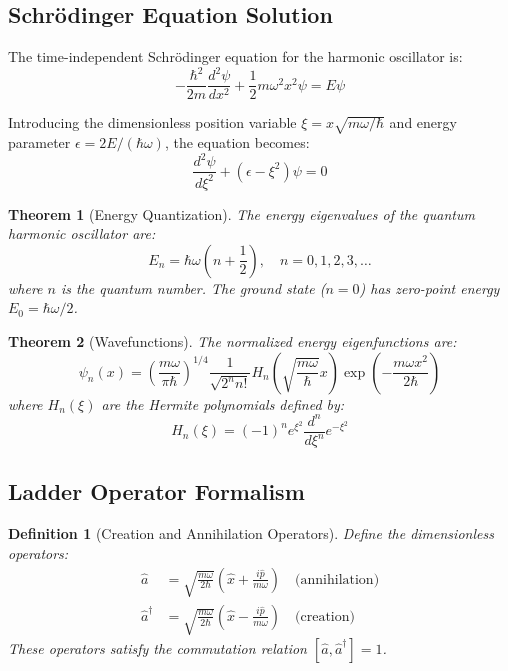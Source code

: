 \documentclass[a4paper, 11pt]{article}
\newtheorem{definition}{Definition}[section]
\newtheorem{theorem}{Theorem}[section]
\begin{document}
\subsection{Schrödinger Equation Solution}

The time-independent Schrödinger equation for the harmonic oscillator is:
\begin{equation}
-\frac{\hbar^2}{2m}\frac{d^2\psi}{dx^2} + \frac{1}{2}m\omega^2 x^2 \psi = E\psi
\end{equation}

Introducing the dimensionless position variable $\xi = x\sqrt{m\omega/\hbar}$ and energy
parameter $\epsilon = 2E/(\hbar\omega)$, the equation becomes:
\begin{equation}
\frac{d^2\psi}{d\xi^2} + (\epsilon - \xi^2)\psi = 0
\end{equation}

\begin{theorem}[Energy Quantization]
The energy eigenvalues of the quantum harmonic oscillator are:
\begin{equation}
E_n = \hbar\omega\left(n + \frac{1}{2}\right), \quad n = 0, 1, 2, 3, \ldots
\end{equation}
where $n$ is the quantum number. The ground state ($n=0$) has zero-point energy $E_0 = \hbar\omega/2$.
\end{theorem}

\begin{theorem}[Wavefunctions]
The normalized energy eigenfunctions are:
\begin{equation}
\psi_n(x) = \left(\frac{m\omega}{\pi\hbar}\right)^{1/4} \frac{1}{\sqrt{2^n n!}}
H_n\left(\sqrt{\frac{m\omega}{\hbar}}x\right) \exp\left(-\frac{m\omega x^2}{2\hbar}\right)
\end{equation}
where $H_n(\xi)$ are the Hermite polynomials defined by:
\begin{equation}
H_n(\xi) = (-1)^n e^{\xi^2} \frac{d^n}{d\xi^n}e^{-\xi^2}
\end{equation}
\end{theorem}

\subsection{Ladder Operator Formalism}

\begin{definition}[Creation and Annihilation Operators]
Define the dimensionless operators:
\begin{align}
\hat{a} &= \sqrt{\frac{m\omega}{2\hbar}}\left(\hat{x} + \frac{i\hat{p}}{m\omega}\right) \quad \text{(annihilation)} \\
\hat{a}^\dagger &= \sqrt{\frac{m\omega}{2\hbar}}\left(\hat{x} - \frac{i\hat{p}}{m\omega}\right) \quad \text{(creation)}
\end{align}
These operators satisfy the commutation relation $[\hat{a}, \hat{a}^\dagger] = 1$.
\end{definition}
\end{document}
